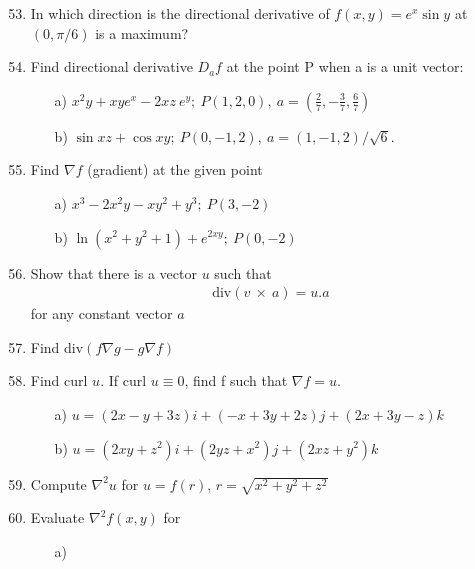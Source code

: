 \documentclass[11pt]{amsbook}
\begin{document}


\begin{enumerate}
     \setcounter{enumi}{52}
    \item
	In which direction is the directional derivative of 
		$f(x,y) = e^x \sin{y}$
	 at 
		$(0, \pi /6)$
	 is a maximum?
    \item
	Find directional derivative 
		$D_{a}f$
	 at the point P when a is a unit vector:
	\begin{enumerate}
		\item[a)]
			$x^{2}y 
				+ xy e^{x} 
				- 2xz~e^{y};
			~ P(1, 2, 0),
			~ a 
				= (\frac
					{2}
					{7} , 
				-\frac
					{3}
					{7} , 
				\frac
					{6}
					{7})$
		\item[b)]
			$\sin{xz} 
				+ \cos{xy}; 
			~P(0, -1, 2),
			~ a = (1, -1, 2)
				/ \sqrt{6}.$
	\end{enumerate}
     \item
	Find $\nabla f$ (gradient) at the given point
	\begin{enumerate}
		\item[a)]
			$x^{3} 
				- 2x^{2}y 
				- xy^{2} 
				+ y^{3};
			~P(3,-2)$
		\item[b)]
			$\ln(x^{2} + y^{2} +1) 
				+ e^{2xy};
			~P(0, -2)$
	\end{enumerate}
     \item
	Show that there is a vector $u$ such that
	\begin{align*}
		\text{div}(v~\times~a)=u.a
	\end{align*}
	for any constant vector $a$
     \item
	Find div$(f\nabla g- g\nabla f)$
     \item
	Find curl $u$. If curl $u\equiv0$, find f such that $\nabla f=u$.
	\begin{enumerate}
		\item[a)]
			$u=(2x-y+3z)i 
				+ (-x+3y+2z)j 
				+ (2x+3y-z)k$
		\item[b)]
			$u=(2xy+z^{2})i
				+(2yz+x^{2})j
				+(2xz+y^{2})k$
	\end{enumerate}
     \item
	Compute $\nabla ^{2}u$ for $u=f(r)$, $r=\sqrt{x^{2}+y^{2}+z^{2}}$
     \item
	Evaluate $\nabla ^{2}f(x,y)$ for
	\begin{multicols}{2}
		\begin{enumerate}
			\item[a)]

\end{enumerate}
\end{multicols}
\end{enumerate}
\end{document}
